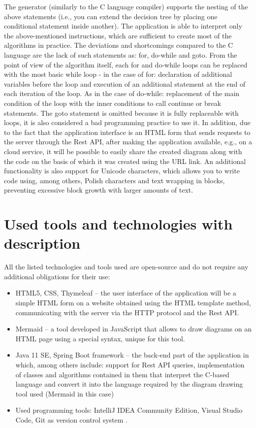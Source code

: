 The generator (similarly to the C language compiler) supports the nesting of the above statements (i.e., you can extend the decision tree by placing one conditional statement inside another). The application is able to interpret only the above-mentioned instructions, which are sufficient to create most of the algorithms in practice. The deviations and shortcomings compared to the C language are the lack of such statements as: for, do-while and goto. From the point of view of the algorithm itself, each for and do-while loops can be replaced with the most basic while loop - in the case of for: declaration of additional variables before the loop and execution of an additional statement at the end of each iteration of the loop. As in the case of do-while: replacement of the main condition of the loop with the inner conditions to call continue or break statements. The goto statement is omitted because it is fully replaceable with loops, it is also considered a bad programming practice to use it. In addition, due to the fact that the application interface is an HTML form that sends requests to the server through the Rest API, after making the application available, e.g., on a cloud service, it will be possible to easily share the created diagram along with the code on the basis of which it was created using the URL link. An additional functionality is also support for Unicode characters, which allows you to write code using, among others, Polish characters and text wrapping in blocks, preventing excessive block growth with larger amounts of text.
  
\section{Used tools and technologies with description }
All the listed technologies and tools used are open-source and do not require any additional obligations for their use:

\begin{itemize}
	\item HTML5, CSS, Thymeleaf -- the user interface of the application will be a simple HTML form on a website obtained using the HTML template method, communicating with the server via the HTTP protocol and the Rest API.	
	
	\item Mermaid -- a tool developed in JavaScript that allows to draw diagrams on an HTML page using a special syntax, unique for this tool.
	
	\item Java 11 SE, Spring Boot framework -- the back-end part of the application in which, among others include: support for Rest API queries, implementation of classes and algorithms contained in them that interpret the C-based language and convert it into the language required by the diagram drawing tool used (Mermaid in this case)
	
	\item Used programming tools: IntelliJ IDEA Community Edition, Visual Studio Code, Git as version control system .
		
		
\end{itemize}
	